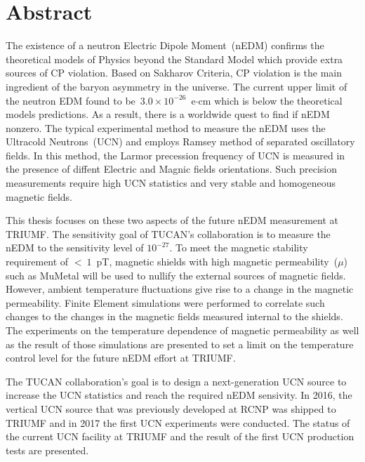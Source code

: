 \documentclass[12pt,a4paper]{book}
\begin{document}
\renewcommand{\thepage}{\roman{page}}
\chapter*{Abstract}
The existence of a neutron Electric Dipole Moment~(nEDM) confirms the
theoretical models of Physics beyond the Standard Model which provide
extra sources of CP violation. Based on Sakharov Criteria, CP
violation is the main ingredient of the baryon asymmetry in the
universe. The current upper limit of the neutron EDM found to
be~$3.0 \times 10^{-26}$~e$\cdot$cm which is below the theoretical
models predictions. As a result, there is a worldwide quest to find if
nEDM nonzero. The typical experimental method to measure the nEDM uses
the Ultracold Neutrons~(UCN) and employs Ramsey method of separated
oscillatory fields. In this method, the Larmor precession frequency of
UCN is measured in the presence of diffent Electric and Magnic fields
orientations. Such precision measurements require high UCN statistics
and very stable and homogeneous magnetic fields.

This thesis focuses on these two aspects of the future nEDM
measurement at TRIUMF. The sensitivity goal of TUCAN's collaboration
is to measure the nEDM to the sensitivity level of $10^{-27}$. To meet
the magnetic stability requirement of $<~1$~pT, magnetic shields with
high magnetic permeability~($\mu$) such as MuMetal will be used to
nullify the external sources of magnetic fields. However, ambient
temperature fluctuations give rise to a change in the magnetic
permeability. Finite Element simulations were performed to correlate
such changes to the changes in the magnetic fields measured internal
to the shields. The experiments on the temperature dependence of
magnetic permeability as well as the result of those simulations are
presented to set a limit on the temperature control level for the
future nEDM effort at TRIUMF.

The TUCAN collaboration's goal is to design a next-generation UCN
source to increase the UCN statistics and reach the required nEDM
sensivity. In 2016, the vertical UCN source that was previously
developed at RCNP was shipped to TRIUMF and in 2017 the first UCN experiments
were conducted. The status of the current UCN facility at
TRIUMF and the result of the first UCN production tests are presented.



\end{document}
